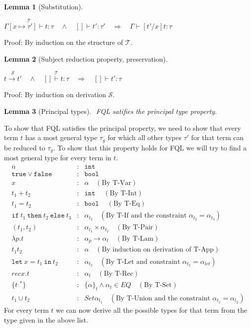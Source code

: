 \documentclass[a4paper]{article}
\newcommand{\s}[1]{\mathtt{#1}}
\newcommand{\sn}{\overline{n}}
\newcommand{\sLb}{\s{\{}}
\newcommand{\sRb}{\s{\}}}
\newcommand{\sbool}{\s{bool\ }}
\newcommand{\sint}{\s{int\ }}
\newcommand{\sif}{\s{if\ }}
\newcommand{\sthen}{\s{\ then\ }}
\newcommand{\selse}{\s{\ else\ }}
\newcommand{\sletin}[2]{\s{let\ } #1 \s{\ in\ } #2}
\newcommand{\strue}{\s{true}}
\newcommand{\sfalse}{\s{false}}
\newcommand{\sset}[1]{\sLb #1 \sRb}
\newcommand{\im}{\Rightarrow}
\newcommand{\step}{\to}
\newcommand{\T}{\mathcal{T}}
\renewcommand{\S}{\mathcal{S}}
\newcommand{\stackover}[2]{\stackrel{{#2}}{#1}}
\newtheorem{lemma}{Lemma}[section]
\begin{document}
\begin{lemma}[Substitution] $ $
  \label{lemma:substitution}

$\stackover{\Gamma[x \mapsto \tau'] \vdash t: \tau}{\T} \quad \land \quad []\vdash t':\tau' \quad \im \quad
\Gamma \vdash [t'/x]t : \tau$
\end{lemma}

Proof: By induction on the structure of $\T$.


\begin{lemma}[Subject reduction property, preservation] $ $
  \label{lemma:preservation}

$\stackover{t \step t'}{\S} \quad \land \quad \stackover{[] \vdash t: \tau}{\T} \quad \im \quad [] \vdash t' : \tau$
\end{lemma}

Proof: By induction on derivation $\S$.

\begin{lemma}[Principal types] $ $
  \label{lemma:principalTypes}
  FQL satifies the principal type property.
\end{lemma}
To show that FQL satisfies the principal property, we need to show that every term $t$ has a most general type $\tau_g$ for which all other types $\tau'$ for that term can be reduced to $\tau_g$. To show that this property holds for FQL we will try to find a most general type for every term in $t$.
\begin{eqnarray*}
\sn &:& \sint\\
\strue \vee \sfalse &:& \sbool\\
x &:& \alpha \quad(\text{By T-Var})\\
t_1 + t_2 &:& \sint \quad(\text{By T-Int})\\
t_1 = t_2 &:& \sbool \quad(\text{By T-Eq})\\
\sif t_1 \sthen t_2 \selse t_3 &:& \alpha_{t_2} \quad(\text{By T-If and the constraint } \alpha_{t_2} = \alpha_{t_3})\\
(t_1, t_2) &:& \alpha_{t_1} \times \alpha_{t_2} \quad(\text{By T-Pair})\\
\lambda p.t &:& \alpha_p \to \alpha_t \quad(\text{By T-Lam})\\
t_1t_2 &:& \alpha \quad(\text{By induction on derivation of T-App})\\
\sletin{x=t_1}{t_2} &:& \alpha_{t_2} \quad(\text{By T-Let and constraint }\alpha_{t_2} = \alpha_{let})\\
rec x.t &:& \alpha_t \quad(\text{By T-Rec})\\
\sLb t^{,*} \sRb &:& \sset \alpha_t \wedge \alpha_t \in EQ \quad(\text{By T-Set})\\
t_1 \cup t_2 &:& Set \alpha_{t_1} \quad(\text{By T-Union and the constraint }\alpha_{t_1} = \alpha_{t_2})
\end{eqnarray*}
For every term $t$ we can now derive all the possible types for that term from the type given in the above list.
\end{document}
